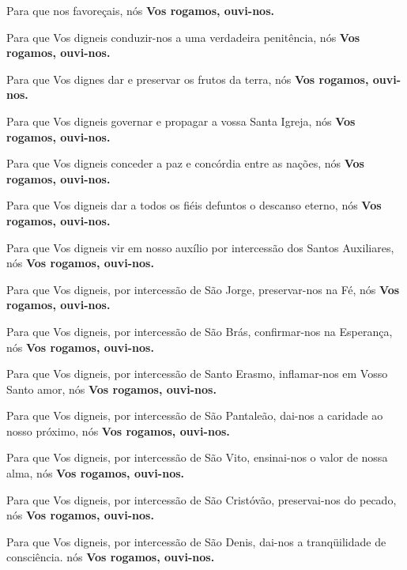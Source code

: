 \documentclass[a4paper,12pt]{extarticle} \usepackage[utf8]{inputenc}
\begin{document}
 

Para que nos favoreçais, nós \textbf{Vos rogamos, ouvi-nos.}

 

Para que Vos digneis conduzir-nos a uma verdadeira penitência, nós \textbf{Vos rogamos, ouvi-nos.}

 

Para que Vos dignes dar e preservar os frutos da terra, nós \textbf{Vos rogamos, ouvi-nos.}

 

Para que Vos digneis governar e propagar a vossa Santa Igreja, nós \textbf{Vos rogamos, ouvi-nos.}

 

Para que Vos digneis conceder a paz e concórdia entre as nações, nós \textbf{Vos rogamos, ouvi-nos.}

 

Para que Vos digneis dar a todos os fiéis defuntos o descanso eterno, nós \textbf{Vos rogamos, ouvi-nos.}

 

Para que Vos digneis vir em nosso auxílio por intercessão dos Santos Auxiliares, nós \textbf{Vos rogamos, ouvi-nos.}

 

Para que Vos digneis, por intercessão de São Jorge, preservar-nos na Fé, nós \textbf{Vos rogamos, ouvi-nos.}

Para que Vos digneis, por intercessão de São Brás, confirmar-nos na Esperança, nós \textbf{Vos rogamos, ouvi-nos.}

 

Para que Vos digneis, por intercessão de Santo Erasmo, inflamar-nos em Vosso Santo amor, nós \textbf{Vos rogamos, ouvi-nos.}

 

Para que Vos digneis, por intercessão de São Pantaleão, dai-nos a caridade ao nosso próximo, nós \textbf{Vos rogamos, ouvi-nos.}

 

Para que Vos digneis, por intercessão de São Vito, ensinai-nos o valor de nossa alma, nós \textbf{Vos rogamos, ouvi-nos.}

 

Para que Vos digneis, por intercessão de São Cristóvão, preservai-nos do pecado, nós \textbf{Vos rogamos, ouvi-nos.}

 

Para que Vos digneis, por intercessão de São Denis, dai-nos a tranqüilidade de consciência. nós \textbf{Vos rogamos, ouvi-nos.}
\end{document}
